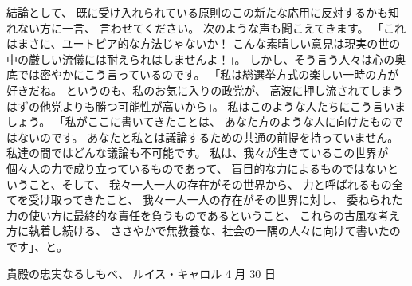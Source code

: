 \documentclass{article}
\begin{document}
\medskip

結論として、
既に受け入れられている原則のこの新たな応用に反対するかも知れない方に一言、
言わせてください。
次のような声も聞こえてきます。
「これはまさに、ユートピア的な方法じゃないか！
こんな素晴しい意見は現実の世の中の厳しい流儀には耐えられはしませんよ！」。
しかし、そう言う人々は心の奥底では密やかにこう言っているのです。
「私は総選挙方式の楽しい一時の方が好きだね。
というのも、私のお気に入りの政党が、
高波に押し流されてしまうはずの他党よりも勝つ可能性が高いから」。
私はこのような人たちにこう言いましょう。
「私がここに書いてきたことは、
あなた方のような人に向けたものではないのです。
あなたと私とは議論するための共通の前提を持っていません。
私達の間ではどんな議論も不可能です。
私は、我々が生きているこの世界が個々人の力で成り立っているものであって、
盲目的な力によるものではないということ、そして、
我々一人一人の存在がその世界から、
力と呼ばれるもの全てを受け取ってきたこと、
我々一人一人の存在がその世界に対し、
委ねられた力の使い方に最終的な責任を負うものであるということ、
これらの古風な考え方に執着し続ける、
ささやかで無教養な、社会の一隅の人々に向けて書いたのです」、と。

\bigskip

貴殿の忠実なるしもべ、
ルイス・キャロル
4 月 30 日
\end{document}
